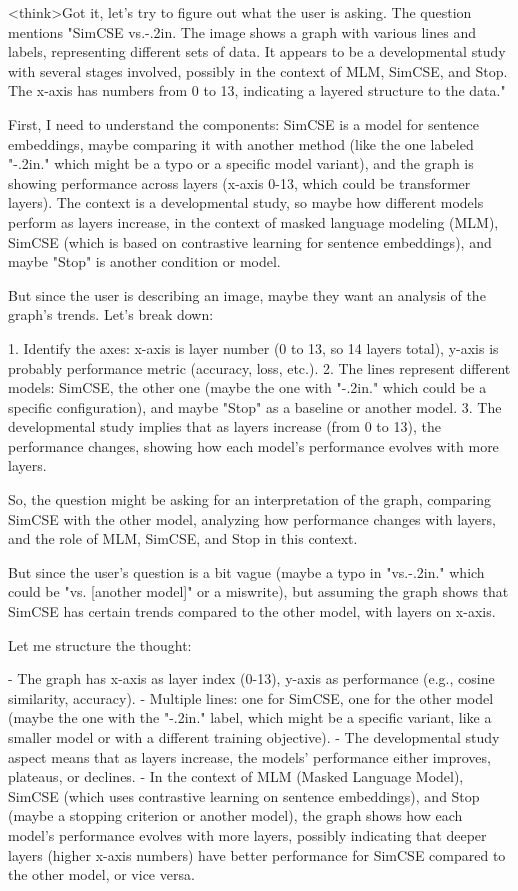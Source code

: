 <think>Got it, let's try to figure out what the user is asking. The question mentions "SimCSE vs.-.2in. The image shows a graph with various lines and labels, representing different sets of data. It appears to be a developmental study with several stages involved, possibly in the context of MLM, SimCSE, and Stop. The x-axis has numbers from 0 to 13, indicating a layered structure to the data." 

First, I need to understand the components: SimCSE is a model for sentence embeddings, maybe comparing it with another method (like the one labeled "-.2in." which might be a typo or a specific model variant), and the graph is showing performance across layers (x-axis 0-13, which could be transformer layers). The context is a developmental study, so maybe how different models perform as layers increase, in the context of masked language modeling (MLM), SimCSE (which is based on contrastive learning for sentence embeddings), and maybe "Stop" is another condition or model.

But since the user is describing an image, maybe they want an analysis of the graph's trends. Let's break down:

1. Identify the axes: x-axis is layer number (0 to 13, so 14 layers total), y-axis is probably performance metric (accuracy, loss, etc.).
2. The lines represent different models: SimCSE, the other one (maybe the one with "-.2in." which could be a specific configuration), and maybe "Stop" as a baseline or another model.
3. The developmental study implies that as layers increase (from 0 to 13), the performance changes, showing how each model's performance evolves with more layers.

So, the question might be asking for an interpretation of the graph, comparing SimCSE with the other model, analyzing how performance changes with layers, and the role of MLM, SimCSE, and Stop in this context.

But since the user's question is a bit vague (maybe a typo in "vs.-.2in." which could be "vs. [another model]" or a miswrite), but assuming the graph shows that SimCSE has certain trends compared to the other model, with layers on x-axis.

Let me structure the thought:

- The graph has x-axis as layer index (0-13), y-axis as performance (e.g., cosine similarity, accuracy).
- Multiple lines: one for SimCSE, one for the other model (maybe the one with the "-.2in." label, which might be a specific variant, like a smaller model or with a different training objective).
- The developmental study aspect means that as layers increase, the models' performance either improves, plateaus, or declines.
- In the context of MLM (Masked Language Model), SimCSE (which uses contrastive learning on sentence embeddings), and Stop (maybe a stopping criterion or another model), the graph shows how each model's performance evolves with more layers, possibly indicating that deeper layers (higher x-axis numbers) have better performance for SimCSE compared to the other model, or vice versa.


